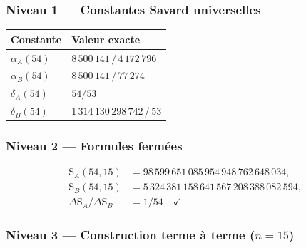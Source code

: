 \documentclass[11pt,a4paper]{article}
\newcommand{\SA}{\mathrm{S}_A}
\newcommand{\SB}{\mathrm{S}_B}
\begin{document}
\subsubsection{Niveau 1 --- Constantes Savard universelles}

\begin{center}\small
\begin{tabular}{@{}l l@{}}
\toprule
\rowcolor{spectralgris}
Constante & Valeur exacte \\
\midrule
$\alpha_A(54)$ & $8\,500\,141\,/\,4\,172\,796$ \\
$\alpha_B(54)$ & $8\,500\,141\,/\,77\,274$ \\
$\delta_A(54)$ & $54/53$ \\
$\delta_B(54)$ & $1\,314\,130\,298\,742\,/\,53$ \\
\bottomrule
\end{tabular}
\end{center}

\subsubsection{Niveau 2 --- Formules fermées}
\begin{align*}
\SA(54,15)&=98\,599\,651\,085\,954\,948\,762\,648\,034,\\
\SB(54,15)&=5\,324\,381\,158\,641\,567\,208\,388\,082\,594,\\
\Delta\SA/\Delta\SB&=1/54\quad\checkmark
\end{align*}

\subsubsection{Niveau 3 --- Construction terme à terme ($n = 15$)}
\end{document}
